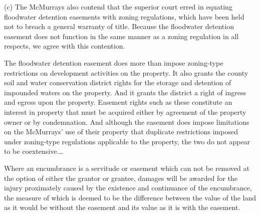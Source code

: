 (c) The McMurrays also contend that the superior court erred in equating
floodwater detention easements with zoning regulations, which have been held
not to breach a general warranty of title. Because the floodwater detention
easement does not function in the same manner as a zoning regulation in all
respects, we agree with this contention. 

The floodwater detention easement does more than impose zoning-type restrictions
on development activities on the property. It also grants the county soil and
water conservation district rights for the storage and detention of impounded
waters on the property. And it grants the district a right of ingress and
egress upon the property. Easement rights such as these constitute an interest
in property that must be acquired either by agreement of the property owner or
by condemnation. And although the easement does impose limitations on the
McMurrays' use of their property that duplicate restrictions imposed under
zoning-type regulations applicable to the property, the two do not appear to be
coextensive.\ldots

Where an encumbrance is a servitude or easement which can not be removed at the
option of either the grantor or grantee, damages will be awarded for the injury
proximately caused by the existence and continuance of the encumbrance, the
measure of which is deemed to be the difference between the value of the land
as it would be without the easement and its value as it is with the easement.

